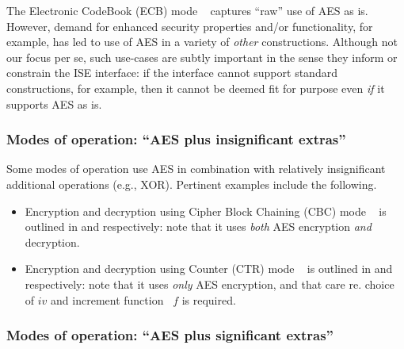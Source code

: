 
The
Electronic CodeBook (ECB) mode
~\cite[Section 6.1]{NIST:sp.800.38a} 
captures ``raw'' use of AES as is.  However, demand for enhanced security
properties and/or functionality, for example, has led to use of AES in a
variety of {\em other} constructions.
Although not our focus per se, such use-cases are subtly important in the 
sense they inform or constrain the ISE interface: if the interface cannot 
support standard constructions, for example, then it cannot be deemed fit 
for purpose even {\em if} it supports AES as is.


\subsubsection{Modes of operation: ``AES plus insignificant extras''}

Some modes of operation use AES in combination with relatively
insignificant 
additional operations
(e.g., XOR).
Pertinent examples include the following.

\begin{itemize}
\item Encryption
      and 
      decryption
      using
      Cipher Block Chaining (CBC) mode
      ~\cite[Section 6.2]{NIST:sp.800.38a}
      is outlined in
      and
      respectively:
      note that it uses {\em both} AES encryption {\em and} decryption.
\item Encryption
      and 
      decryption
      using
      Counter               (CTR) mode
      ~\cite[Section 6.5]{NIST:sp.800.38a}
      is outlined in
      and
      respectively:
      note that it uses {\em only} AES encryption, and that care re. choice 
      of $iv$ and increment function~\cite[Appendix B]{NIST:sp.800.38a} $f$ 
      is required.
\end{itemize}


\subsubsection{Modes of operation: ``AES plus   significant extras''}


